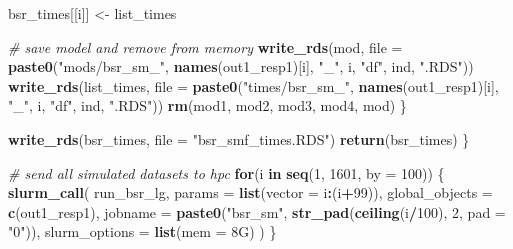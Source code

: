 \documentclass[12pt, twoside]{amherstthesis}
\newenvironment{Shaded}{\begin{snugshade}}{\end{snugshade}}
\newcommand{\AttributeTok}[1]{\textcolor[rgb]{0.13,0.29,0.53}{#1}}
\newcommand{\CommentTok}[1]{\textcolor[rgb]{0.56,0.35,0.01}{\textit{#1}}}
\newcommand{\ControlFlowTok}[1]{\textcolor[rgb]{0.13,0.29,0.53}{\textbf{#1}}}
\newcommand{\DecValTok}[1]{\textcolor[rgb]{0.00,0.00,0.81}{#1}}
\newcommand{\FunctionTok}[1]{\textcolor[rgb]{0.13,0.29,0.53}{\textbf{#1}}}
\newcommand{\NormalTok}[1]{#1}
\newcommand{\OtherTok}[1]{\textcolor[rgb]{0.56,0.35,0.01}{#1}}
\newcommand{\SpecialCharTok}[1]{\textcolor[rgb]{0.81,0.36,0.00}{\textbf{#1}}}
\newcommand{\StringTok}[1]{\textcolor[rgb]{0.31,0.60,0.02}{#1}}
\begin{document}
\begin{Shaded}
\begin{Highlighting}[]
\NormalTok{    bsr\_times[[i]] }\OtherTok{\textless{}{-}}\NormalTok{ list\_times}
    
    \CommentTok{\# save model and remove from memory}
    \FunctionTok{write\_rds}\NormalTok{(mod, }\AttributeTok{file =} 
                \FunctionTok{paste0}\NormalTok{(}\StringTok{"mods/bsr\_sm\_"}\NormalTok{, }\FunctionTok{names}\NormalTok{(out1\_resp1)[i], }\StringTok{"\_"}\NormalTok{, i, }
                       \StringTok{"df"}\NormalTok{, ind, }\StringTok{".RDS"}\NormalTok{))}
    \FunctionTok{write\_rds}\NormalTok{(list\_times, }\AttributeTok{file =} 
                 \FunctionTok{paste0}\NormalTok{(}\StringTok{"times/bsr\_sm\_"}\NormalTok{, }\FunctionTok{names}\NormalTok{(out1\_resp1)[i], }\StringTok{"\_"}\NormalTok{, i, }
                        \StringTok{"df"}\NormalTok{, ind, }\StringTok{".RDS"}\NormalTok{))}
    \FunctionTok{rm}\NormalTok{(mod1, mod2, mod3, mod4, mod)}
\NormalTok{  \}}
  
  \FunctionTok{write\_rds}\NormalTok{(bsr\_times, }\AttributeTok{file =} \StringTok{"bsr\_smf\_times.RDS"}\NormalTok{)}
  \FunctionTok{return}\NormalTok{(bsr\_times)}
\NormalTok{\}}

\CommentTok{\# send all simulated datasets to hpc}
\ControlFlowTok{for}\NormalTok{(i }\ControlFlowTok{in} \FunctionTok{seq}\NormalTok{(}\DecValTok{1}\NormalTok{, }\DecValTok{1601}\NormalTok{, }\AttributeTok{by =} \DecValTok{100}\NormalTok{)) \{}
  \FunctionTok{slurm\_call}\NormalTok{(}
\NormalTok{    run\_bsr\_lg,}
    \AttributeTok{params =} \FunctionTok{list}\NormalTok{(}\AttributeTok{vector =}\NormalTok{ i}\SpecialCharTok{:}\NormalTok{(i}\SpecialCharTok{+}\DecValTok{99}\NormalTok{)),}
    \AttributeTok{global\_objects =} \FunctionTok{c}\NormalTok{(}\StringTok{\textquotesingle{}out1\_resp1\textquotesingle{}}\NormalTok{),}
    \AttributeTok{jobname =} \FunctionTok{paste0}\NormalTok{(}\StringTok{"bsr\_sm"}\NormalTok{, }\FunctionTok{str\_pad}\NormalTok{(}\FunctionTok{ceiling}\NormalTok{(i}\SpecialCharTok{/}\DecValTok{100}\NormalTok{), }\DecValTok{2}\NormalTok{, }\AttributeTok{pad =} \StringTok{"0"}\NormalTok{)),}
    \AttributeTok{slurm\_options =} \FunctionTok{list}\NormalTok{(}\AttributeTok{mem =} \StringTok{\textquotesingle{}8G\textquotesingle{}}\NormalTok{)}
\NormalTok{  )}
\NormalTok{\}}
\end{Highlighting}
\end{Shaded}
\normalsize
\end{document}
